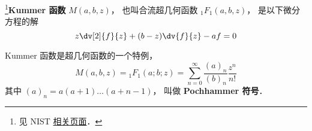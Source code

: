 
\begin{issues}
\issueDraft
\end{issues}

\footnote{见 NIST \href{https://dlmf.nist.gov/13.2}{相关页面}．}\textbf{Kummer 函数} $M(a, b, z)$， 也叫合流超几何函数 $_1F_1(a, b, z)$， 是以下微分方程的解
\begin{equation}
z\dv[2]{f}{z} + (b-z)\dv{f}{z} - a f = 0
\end{equation}

Kummer 函数是超几何函数的一个特例， 
\begin{equation}
M(a, b, z) = {_1F_1}(a; b; z) = \sum_{n=0}^\infty \frac{(a)_n}{(b)_n} \frac{z^n}{n!}
\end{equation}
其中 $(a)_n = a(a+1)\dots(a+n-1)$， 叫做 \textbf{Pochhammer 符号}．


